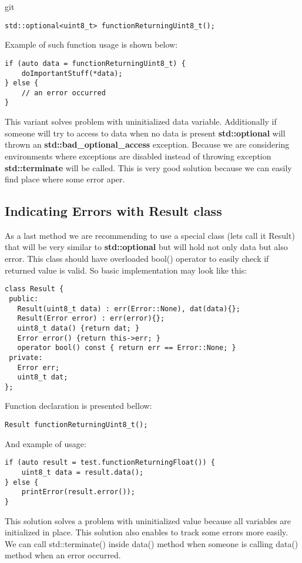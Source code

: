 git \documentclass{article}
\let\Oldsubsection\subsection
\renewcommand{\subsection}{\FloatBarrier\Oldsubsection}
\begin{document}
\begin{lstlisting}
std::optional<uint8_t> functionReturningUint8_t();
\end{lstlisting}

Example of such function usage is shown below:
\begin{lstlisting}
if (auto data = functionReturningUint8_t) {
    doImportantStuff(*data);
} else {
    // an error occurred
}
\end{lstlisting}

This variant solves problem with uninitialized data variable. Additionally if someone will try to access to data when no data is present \textbf{std::optional} will thrown an \textbf{std::bad\_optional\_access} exception. Because we are considering environments where exceptions are disabled instead of throwing exception \textbf{std::terminate} will be called. This is very good solution because we can easily find place where some error aper. 

\subsection{Indicating Errors with Result class}
As a last method we are recommending to use a special class (lets call it Result) that will be very similar to \textbf{
std::optional} but will hold not only data but also error. This class should have overloaded bool() operator to easily check if returned value is valid. So basic implementation may look like this:
\begin{lstlisting}
class Result {
 public:
   Result(uint8_t data) : err(Error::None), dat(data){};   
   Result(Error error) : err(error){};
   uint8_t data() {return dat; }
   Error error() {return this->err; }
   operator bool() const { return err == Error::None; }
 private:
   Error err;
   uint8_t dat;
};
\end{lstlisting}

Function declaration is presented bellow:
\begin{lstlisting}
Result functionReturningUint8_t();
\end{lstlisting}

And example of usage:
\begin{lstlisting}
if (auto result = test.functionReturningFloat()) {
    uint8_t data = result.data();
} else {
    printError(result.error());
}
\end{lstlisting}

This solution solves a problem with uninitialized value because all variables are initialized in place. This solution also enables to track some errors more easily. We can call std::terminate() inside data() method when someone is calling data() method when an error occurred.
\end{document}
